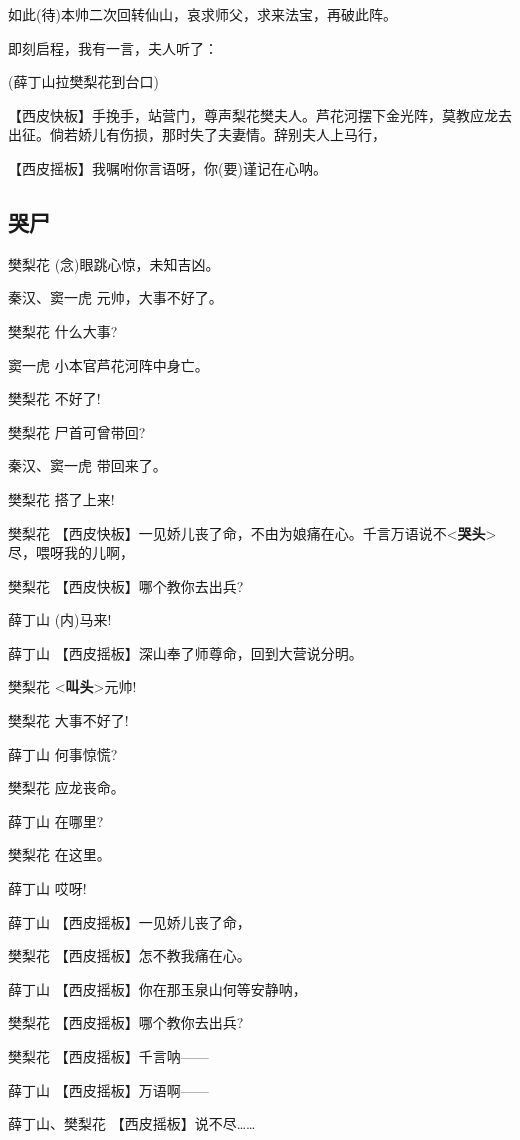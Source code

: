 如此(待)本帅二次回转仙山，哀求师父，求来法宝，再破此阵。

即刻启程，我有一言，夫人听了：

(薛丁山拉樊梨花到台口)

【西皮快板】手挽手，站营门，尊声梨花樊夫人。芦花河摆下金光阵，莫教应龙去出征。倘若娇儿有伤损，那时失了夫妻情。辞别夫人上马行，

【西皮摇板】我嘱咐你言语呀，你(要)谨记在心呐。

\newpage
\hypertarget{ux54edux5c38}{%
\subsection{哭尸}\label{ux54edux5c38}}

樊梨花 (念)眼跳心惊，未知吉凶。

秦汉、窦一虎 元帅，大事不好了。

樊梨花 什么大事?

窦一虎 小本官芦花河阵中身亡。

樊梨花 不好了!

樊梨花 尸首可曾带回?

秦汉、窦一虎 带回来了。

樊梨花 搭了上来!

樊梨花
【西皮快板】一见娇儿丧了命，不由为娘痛在心。千言万语说不\textless{}\textbf{哭头}\textgreater{}尽，喂呀我的儿啊，

樊梨花 【西皮快板】哪个教你去出兵?

薛丁山 (内)马来!

薛丁山 【西皮摇板】深山奉了师尊命，回到大营说分明。

樊梨花 \textless{}\textbf{叫头}\textgreater{}元帅!

樊梨花 大事不好了!

薛丁山 何事惊慌?

樊梨花 应龙丧命。

薛丁山 在哪里?

樊梨花 在这里。

薛丁山 哎呀!

薛丁山 【西皮摇板】一见娇儿丧了命，

樊梨花 【西皮摇板】怎不教我痛在心。

薛丁山 【西皮摇板】你在那玉泉山何等安静呐，

樊梨花 【西皮摇板】哪个教你去出兵?

樊梨花 【西皮摇板】千言呐------

薛丁山 【西皮摇板】万语啊------

薛丁山、樊梨花 【西皮摇板】说不尽\ldots{}\ldots{}

